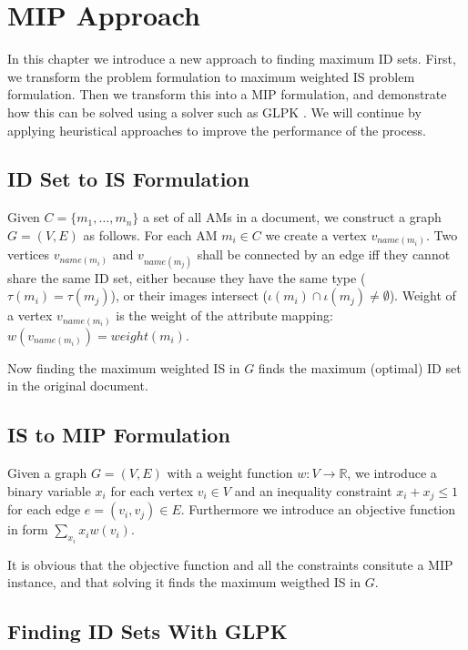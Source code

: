 \chapter{MIP Approach}
\label{chapter-mip}

In this chapter we introduce a new approach to finding maximum ID sets. First, we transform the problem formulation to maximum weighted IS problem formulation. Then we transform this into a MIP formulation, and demonstrate how this can be solved using a solver such as GLPK \cite{glpk}. 
We will continue by applying heuristical approaches to improve the performance of the process.

\section{ID Set to IS Formulation}

Given $C = \{m_1, \ldots, m_n\}$ a set of all AMs in a document, we construct a graph $G = (V,E)$ as follows. For each AM $m_i \in C$ we create a vertex $v_{name(m_i)}$. Two vertices $v_{name(m_i)}$ and $v_{name(m_j)}$ shall be connected by an edge iff they cannot share the same ID set, either because they have the same type ($\tau(m_i) = \tau(m_j)$), or their images intersect ($\iota(m_i) \cap \iota(m_j) \neq \emptyset$). Weight of a vertex $v_{name(m_i)}$ is the weight of the attribute mapping: $w(v_{name(m_i)}) = weight(m_i)$.

Now finding the maximum weighted IS in $G$ finds the maximum (optimal) ID set in the original document.

\section{IS to MIP Formulation}

Given a graph $G = (V,E)$ with a weight function $w: V \rightarrow \mathbb{R}$, we introduce a binary variable $x_i$ for each vertex $v_i \in V$ and an inequality constraint $x_i + x_j \leq 1$ for each edge $e = (v_i, v_j) \in E$. Furthermore we introduce an objective function in form $\sum_{x_i} x_i w(v_i)$.

It is obvious that the objective function and all the constraints consitute a MIP instance, and that solving it finds the maximum weigthed IS in $G$.

\section{Finding ID Sets With GLPK}
\label{section-mip-glpk}

